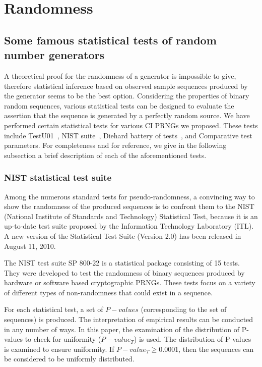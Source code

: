 \chapter{Randomness}
\label{Statistical Tests for Randomness}
\minitoc

\section{Some famous statistical tests of random number generators}
\label{Some famous statistical tests of random number generators}

A theoretical proof for the randomness of a generator is impossible to give, therefore statistical inference based on observed sample sequences produced by the generator seems to be the best option. Considering the properties of binary
random sequences, various statistical tests can be designed to evaluate the assertion
that the sequence is generated by a perfectly random source. 
We have performed certain statistical tests for various CI PRNGs we proposed. These tests
include TestU01~\cite{Lecuyer2009}, NIST suite~\cite{ANDREW2008},
Diehard battery of tests~\cite{Marsaglia1996}, and Comparative test parameters. For completeness and for reference, we give
in the following subsection a brief description of each of the
aforementioned tests.



\subsection{NIST statistical test suite}



Among the numerous standard tests for pseudo-randomness, a convincing way to show the randomness of the produced sequences is to confront them to the NIST (National Institute of  Standards and Technology) Statistical Test, because it is an up-to-date test suite proposed by the Information Technology Laboratory (ITL). A new version of the Statistical Test Suite (Version 2.0) has been released in August 11, 2010.


The NIST test suite SP 800-22 is a statistical package consisting of 15 tests. They were developed to test the randomness of binary sequences produced by hardware or software based cryptographic PRNGs. These tests focus on a variety of different types of non-randomness that could exist in a sequence. 


For each statistical test, a set of $P-values$ (corresponding to the set of sequences) is produced. The interpretation of empirical results can be conducted in any number of ways. In this paper, the examination of the distribution of P-values to check for uniformity ($ P-value_{T}$) is used.
The distribution of P-values is examined to ensure uniformity. 
If $P-value_{T} \geqslant 0.0001$, then the sequences can be considered to be uniformly distributed.

